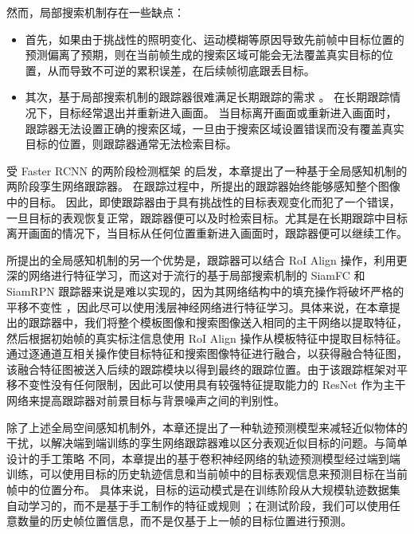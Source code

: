 然而，局部搜索机制存在一些缺点：

\begin{itemize}
\item 首先，如果由于挑战性的照明变化、运动模糊等原因导致先前帧中目标位置的预测偏离了预期，则在当前帧生成的搜索区域可能会无法覆盖真实目标的位置，从而导致不可逆的累积误差，在后续帧彻底跟丢目标。
\item 其次，基于局部搜索机制的跟踪器很难满足长期跟踪的需求 \cite{kalal2011tracking, hong2015multi}。
在长期跟踪情况下，目标经常退出并重新进入画面。
当目标离开画面或重新进入画面时，跟踪器无法设置正确的搜索区域，一旦由于搜索区域设置错误而没有覆盖真实目标的位置，则跟踪器通常无法检索目标。
\end{itemize}

受 Faster RCNN 的两阶段检测框架 \cite{ren2015faster} 的启发，本章提出了一种基于全局感知机制的两阶段孪生网络跟踪器。
在跟踪过程中，所提出的跟踪器始终能够感知整个图像中的目标。
因此，即使跟踪器由于具有挑战性的目标表观变化而犯了一个错误，一旦目标的表观恢复正常，跟踪器便可以及时检索目标。尤其是在长期跟踪中目标离开画面的情况下，当目标从任何位置重新进入画面时，跟踪器便可以继续工作。

所提出的全局感知机制的另一个优势是，跟踪器可以结合 RoI Align \cite{He2018MaskR} 操作，利用更深的网络进行特征学习，而这对于流行的基于局部搜索机制的 SiamFC \cite{SiamFC} 和 SiamRPN \cite{SiamRPN} 跟踪器来说是难以实现的，因为其网络结构中的填充操作将破坏严格的平移不变性 \cite{SiamRPN++}，因此尽可以使用浅层神经网络进行特征学习。具体来说，在本章提出的跟踪器中，我们将整个模板图像和搜索图像送入相同的主干网络以提取特征，然后根据初始帧的真实标注信息使用 RoI Align 操作从模板特征中提取目标特征。通过逐通道互相关操作使目标特征和搜索图像特征进行融合，以获得融合特征图，该融合特征图被送入后续的跟踪模块以得到最终的跟踪位置。由于该跟踪框架对平移不变性没有任何限制，因此可以使用具有较强特征提取能力的 ResNet \cite{he2016deep} 作为主干网络来提高跟踪器对前景目标与背景噪声之间的判别性。

除了上述全局空间感知机制外，本章还提出了一种轨迹预测模型来减轻近似物体的干扰，以解决端到端训练的孪生网络跟踪器难以区分表观近似目标的问题。与简单设计的手工策略 \cite{SiamFC, SiamRPN} 不同，本章提出的基于卷积神经网络的轨迹预测模型经过端到端训练，可以使用目标的历史轨迹信息和当前帧中的目标表观信息来预测目标在当前帧中的位置分布。
具体来说，目标的运动模式是在训练阶段从大规模轨迹数据集自动学习的，而不是基于手工制作的特征或规则 \cite{iswanto2017visual}；在测试阶段，我们可以使用任意数量的历史帧位置信息，而不是仅基于上一帧的目标位置进行预测。

